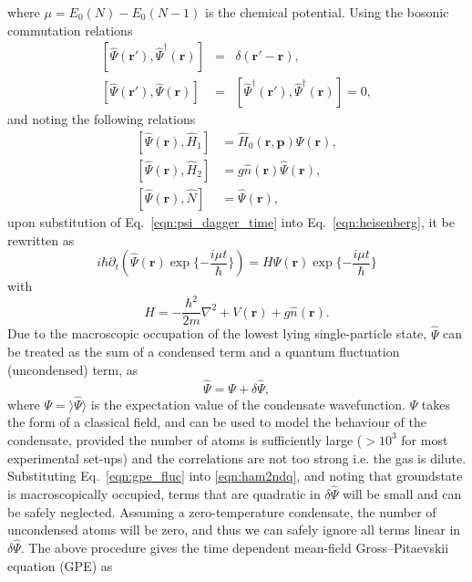 where $\mu=E_0(N) - E_0(N-1)$ is the chemical potential. Using the bosonic commutation relations
\begin{eqnarray}
\left[\hat{\Psi}(\textbf{r}'), \hat{\Psi}^{\dagger}(\textbf{r})\right] &=& \delta(\textbf{r}' - \textbf{r}), \\
\left[\hat{\Psi}(\textbf{r}'), \hat{\Psi}(\textbf{r})\right] &=& \left[\hat{\Psi}^{\dagger}(\textbf{r}'), \hat{\Psi}^{\dagger}(\textbf{r})\right] = 0,
\end{eqnarray}
and noting the following relations
\begin{align}
\left[\hat{\Psi}(\textbf{r}),\hat{H}_1 \right] & = \hat{H}_0(\textbf{r},\textbf{p})\hat{\Psi}(\textbf{r}), \\
\left[\hat{\Psi}(\textbf{r}),\hat{H}_2 \right] & = g\hat{n}(\textbf{r})\hat{\Psi}(\textbf{r}), \\
\left[\hat{\Psi}(\textbf{r}),\hat{N} \right] & = \hat{\Psi}(\textbf{r}) ,
\end{align}
upon substitution of Eq.~\eqref{eqn:psi_dagger_time} into Eq.~\eqref{eqn:heisenberg}, it be rewritten as
\begin{equation}\label{eqn:almost_gpe}
    i \hbar \partial_t \left( \hat{\Psi}(\textbf{r}) \exp\{-\frac{i\mu t}{\hbar}\} \right) = H \hat{\Psi}(\textbf{r}) \exp\{-\frac{i\mu t}{\hbar}\}
\end{equation}
with
\begin{equation}\label{eqn:h_many}
H =  -\frac{\hbar^2}{2m}\nabla^2  + V(\textbf{r}) + g\hat{n}(\textbf{r}).
\end{equation}
Due to the macroscopic occupation of the lowest lying single-particle state, $\hat{\Psi}$ can be treated as the sum of a condensed term and a quantum fluctuation (uncondensed) term, as
\begin{equation}\label{eqn:gpe_fluc}
    \hat{\Psi} = \Psi + \delta\hat{\Psi},
\end{equation}
where $\Psi = \rangle \hat{\Psi} \rangle$ is the expectation value of the condensate wavefunction. $\Psi$ takes the form of a classical field, and can be used to model the behaviour of the condensate, provided the number of atoms is sufficiently large ($>10^3$ for most experimental set-ups) and the correlations are not too strong i.e. the gas is dilute. Substituting Eq.~\eqref{eqn:gpe_fluc} into \eqref{eqn:ham2ndq}, and noting that groundstate is macroscopically occupied, terms that are quadratic in $\delta \hat{\Psi}$ will be small and can be safely neglected. Assuming a zero-temperature condensate, the number of uncondensed atoms will be zero, and thus we can safely ignore all terms linear in $\delta\hat{\Psi}$. The above procedure gives the time dependent mean-field Gross--Pitaevskii equation (GPE) as
